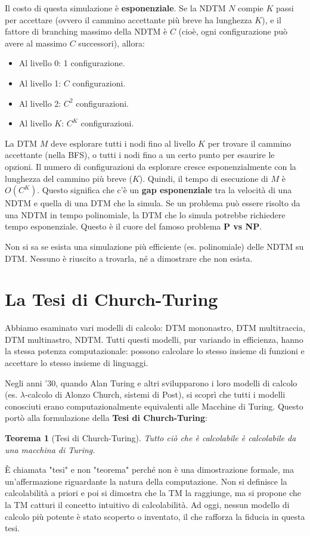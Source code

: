 \documentclass[a4paper]{article}
\theoremstyle{definition} %
\newtheorem{theorem}{Teorema}
\begin{document}
Il costo di questa simulazione è \textbf{esponenziale}. Se la NDTM $N$ compie $K$ passi per accettare (ovvero il cammino accettante più breve ha lunghezza $K$), e il fattore di branching massimo della NDTM è $C$ (cioè, ogni configurazione può avere al massimo $C$ successori), allora:
\begin{itemize}
    \item Al livello 0: 1 configurazione.
    \item Al livello 1: $C$ configurazioni.
    \item Al livello 2: $C^2$ configurazioni.
    \item Al livello $K$: $C^K$ configurazioni.
\end{itemize}
La DTM $M$ deve esplorare tutti i nodi fino al livello $K$ per trovare il cammino accettante (nella BFS), o tutti i nodi fino a un certo punto per esaurire le opzioni. Il numero di configurazioni da esplorare cresce esponenzialmente con la lunghezza del cammino più breve ($K$). Quindi, il tempo di esecuzione di $M$ è $O(C^K)$.
Questo significa che c'è un \textbf{gap esponenziale} tra la velocità di una NDTM e quella di una DTM che la simula. Se un problema può essere risolto da una NDTM in tempo polinomiale, la DTM che lo simula potrebbe richiedere tempo esponenziale. Questo è il cuore del famoso problema \textbf{P vs NP}.

Non si sa se esista una simulazione più efficiente (es. polinomiale) delle NDTM su DTM. Nessuno è riuscito a trovarla, né a dimostrare che non esista.

\section{La Tesi di Church-Turing}

Abbiamo esaminato vari modelli di calcolo: DTM mononastro, DTM multitraccia, DTM multinastro, NDTM. Tutti questi modelli, pur variando in efficienza, hanno la stessa potenza computazionale: possono calcolare lo stesso insieme di funzioni e accettare lo stesso insieme di linguaggi.

Negli anni '30, quando Alan Turing e altri svilupparono i loro modelli di calcolo (es. $\lambda$-calcolo di Alonzo Church, sistemi di Post), si scoprì che tutti i modelli conosciuti erano computazionalmente equivalenti alle Macchine di Turing. Questo portò alla formulazione della \textbf{Tesi di Church-Turing}:

\begin{theorem}[Tesi di Church-Turing]
\emph{Tutto ciò che è calcolabile è calcolabile da una macchina di Turing.}
\end{theorem}
È chiamata "tesi" e non "teorema" perché non è una dimostrazione formale, ma un'affermazione riguardante la natura della computazione. Non si definisce la calcolabilità a priori e poi si dimostra che la TM la raggiunge, ma si propone che la TM catturi il concetto intuitivo di calcolabilità. Ad oggi, nessun modello di calcolo più potente è stato scoperto o inventato, il che rafforza la fiducia in questa tesi.
\end{document}
